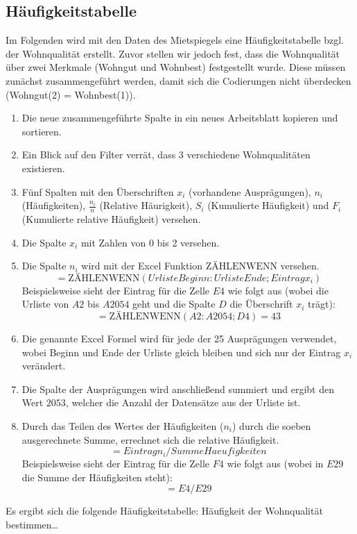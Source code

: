 \subsection{Häufigkeitstabelle}
Im Folgenden wird mit den Daten des Mietspiegels eine Häufigkeitstabelle bzgl. der Wohnqualität
erstellt. Zuvor stellen wir jedoch fest, dass die Wohnqualität über zwei Merkmale (Wohngut und
Wohnbest) festgestellt wurde. Diese müssen zunächst zusammengeführt werden, damit sich die Codierungen nicht
überdecken (Wohngut(2) = Wohnbest(1)). 

\begin{enumerate}
  \item Die neue zusammengeführte Spalte  in ein neues Arbeitsblatt kopieren und
  sortieren.
  \item Ein Blick auf den Filter verrät, dass 3 verschiedene Wohnqualitäten existieren.
  \item Fünf Spalten mit den Überschriften $x_i$ (vorhandene Ausprägungen), $n_i$
  (Häufigkeiten), $\frac{n_i}{n}$ (Relative Häurigkeit), $S_i$ (Kumulierte Häufigkeit) und $F_i$
  (Kumulierte relative Häufigkeit) versehen.
  \item Die Spalte $x_i$ mit Zahlen von 0 bis 2 versehen.
  \item Die Spalte $n_i$ wird mit der Excel Funktion $\text{ZÄHLENWENN}$ versehen.
  \[=\text{ZÄHLENWENN}(UrlisteBeginn:UrlisteEnde;Eintrag x_i)\] Beispielsweise sieht der
  Eintrag für die Zelle $E4$ wie folgt aus (wobei die Urliste von $A2$ bis $A2054$ geht und
  die Spalte $D$ die Überschrift $x_i$ trägt): \[=\text{ZÄHLENWENN}(A2:A2054;D4)=43\]
  \item Die genannte Excel Formel wird für jede der 25 Ausprägungen verwendet, wobei Beginn und Ende
  der Urliste gleich bleiben und sich nur der Eintrag $x_i$ verändert.
  \item Die Spalte der Ausprägungen wird anschließend summiert und ergibt den Wert $2053$, welcher
  die Anzahl der Datensätze aus der Urliste ist.
  \item Durch das Teilen des Wertes der Häufigkeiten ($n_i$) durch die soeben
  ausgerechnete Summe, errechnet sich die relative Häufigkeit. \[=Eintrag n_i/SummeHaeufigkeiten\]
  Beispielsweise sieht der Eintrag für die Zelle $F4$ wie folgt aus (wobei in $E29$ die Summe der
  Häufigkeiten steht): \[=E4/E29\]
\end{enumerate} 

\newpage
Es ergibt sich die folgende Häufigkeitstabelle:
Häufigkeit der Wohnqualität bestimmen\ldots



